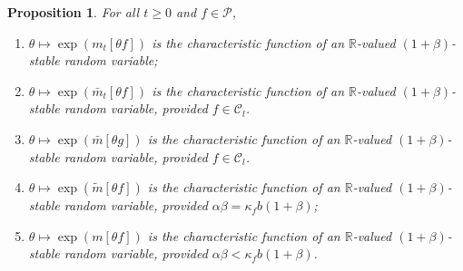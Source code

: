 \documentclass[12pt,a4paper]{amsart}
\theoremstyle{plain}
\newtheorem{lem}[thm]{Lemma}
\newtheorem{prop}[thm]{Proposition}
\theoremstyle{definition}
\numberwithin{equation}{section}
\begin{document}
\begin{prop}
\label{prop: alpha stable rv}
    For all $t\geq 0$ and $f\in \mathcal P$,
\begin{enumerate}
\item
\label{item: stable 1}
    $\theta \mapsto \exp(m_t[\theta f])$ is the characteristic function of an $\mathbb R$-valued $(1+\beta)$-stable random variable;
\item 
\label{item: stable 2}
    $\theta \mapsto \exp(\bar{m}_t[\theta f])$ is the characteristic function of an $\mathbb R$-valued $(1+\beta)$-stable random variable, provided $f \in \mathcal C_l$.
\item 
\label{item: stable 3}
    $\theta \mapsto \exp(\bar m[\theta g])$ is the characteristic function of an $\mathbb R$-valued $(1+\beta)$-stable random variable, provided $f \in \mathcal C_l$.
\item
\label{item: stable 4}
    $\theta \mapsto \exp(\tilde m[\theta f])$ is the characteristic function of an $\mathbb R$-valued $(1+\beta)$-stable random variable, provided $\alpha\beta=\kappa_f b(1+\beta)$;
\item
\label{item: stable 5}
    $\theta \mapsto \exp(m[\theta f])$ is the characteristic function of an $\mathbb R$-valued $(1+\beta)$-stable random variable, provided $\alpha\beta < \kappa_f b(1+\beta)$.
\end{enumerate}
\end{prop}
%
\end{document}
